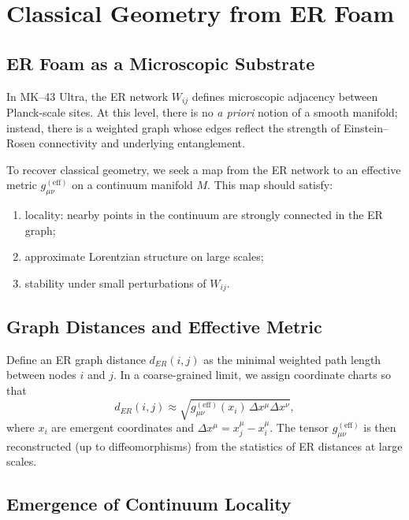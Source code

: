 
\chapter{Classical Geometry from ER Foam}

\section{ER Foam as a Microscopic Substrate}

In MK--43 Ultra, the ER network $W_{ij}$ defines microscopic adjacency between Planck-scale sites.
At this level, there is no \emph{a priori} notion of a smooth manifold; instead, there is a weighted graph whose edges reflect the strength of Einstein--Rosen connectivity and underlying entanglement.

To recover classical geometry, we seek a map from the ER network to an effective metric $g_{\mu\nu}^{\mathrm{(eff)}}$ on a continuum manifold $M$.
This map should satisfy:
\begin{enumerate}
  \item locality: nearby points in the continuum are strongly connected in the ER graph;
  \item approximate Lorentzian structure on large scales;
  \item stability under small perturbations of $W_{ij}$.
\end{enumerate}

\section{Graph Distances and Effective Metric}

Define an ER graph distance $d_{ER}(i,j)$ as the minimal weighted path length between nodes $i$ and $j$.
In a coarse-grained limit, we assign coordinate charts so that
\[
  d_{ER}(i,j) \approx \sqrt{g_{\mu\nu}^{\mathrm{(eff)}}(x_i)\,\Delta x^\mu\Delta x^\nu},
\]
where $x_i$ are emergent coordinates and $\Delta x^\mu = x_j^\mu - x_i^\mu$.
The tensor $g_{\mu\nu}^{\mathrm{(eff)}}$ is then reconstructed (up to diffeomorphisms) from the statistics of ER distances at large scales.

\section{Emergence of Continuum Locality}

